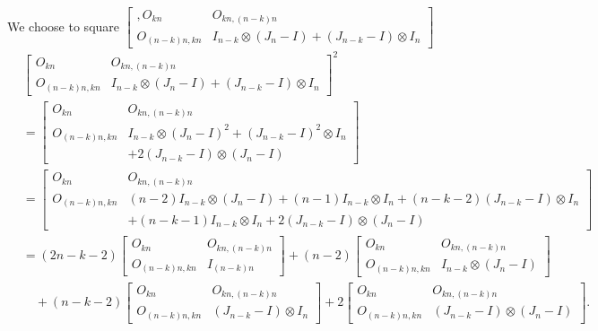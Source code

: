 We choose to square $\begin{bmatrix},
        O_{kn} & O_{kn, (n-k)n} \\
        O_{(n-k)n,kn} & I_{n-k}\otimes(J_n-I)+(J_{n-k}-I)\otimes I_n
    \end{bmatrix}$
\begin{align*}
    &\begin{bmatrix}
        O_{kn} & O_{kn, (n-k)n} \\
        O_{(n-k)n,kn} & I_{n-k}\otimes(J_n-I)+(J_{n-k}-I)\otimes I_n
    \end{bmatrix}^2\\
    &= \begin{bmatrix}
        O_{kn} & O_{kn, (n-k)n} \\
        O_{(n-k)n,kn} & I_{n-k}\otimes(J_n-I)^2 + (J_{n-k}-I)^2 \otimes I_n \\
        &+2(J_{n-k}-I)\otimes(J_n-I)
    \end{bmatrix}\\
    &= \begin{bmatrix}
        O_{kn} & O_{kn, (n-k)n} \\
        O_{(n-k)n,kn} & (n-2)I_{n-k}\otimes(J_n-I) + (n-1)I_{n-k}\otimes I_n + (n-k-2)(J_{n-k}-I) \otimes I_n \\
        &+(n-k-1)I_{n-k}\otimes I_n +2(J_{n-k}-I)\otimes(J_n-I)
    \end{bmatrix}\\
    &= (2n-k-2)\begin{bmatrix}
        O_{kn} & O_{kn, (n-k)n} \\
        O_{(n-k)n,kn} & I_{(n-k)n}
    \end{bmatrix} + (n-2)\begin{bmatrix}
         O_{kn} & O_{kn, (n-k)n} \\
        O_{(n-k)n,kn} & I_{n-k}\otimes(J_n-I)
    \end{bmatrix}\\
    &\quad + (n-k-2)\begin{bmatrix}
         O_{kn} & O_{kn, (n-k)n} \\
        O_{(n-k)n,kn} &(J_{n-k}-I) \otimes I_n
    \end{bmatrix} + 2\begin{bmatrix}
         O_{kn} & O_{kn, (n-k)n} \\
        O_{(n-k)n,kn} & (J_{n-k}-I)\otimes(J_n-I)
    \end{bmatrix}.
\end{align*}

